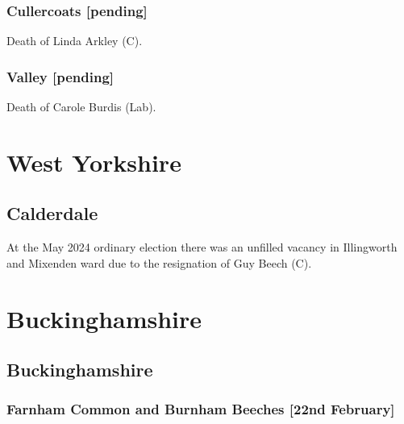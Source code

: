 \documentclass[a4paper,openany]{book}
\begin{document}
\begin{resultsiii}
\subsubsection*{Cullercoats \hspace*{\fill}\nolinebreak[1]%
	\enspace\hspace*{\fill}
	[pending]}


Death of Linda Arkley (C).

\subsubsection*{Valley \hspace*{\fill}\nolinebreak[1]%
	\enspace\hspace*{\fill}
	[pending]}


Death of Carole Burdis (Lab).

\section{West Yorkshire}

\subsection*{Calderdale}

At the May 2024 ordinary election there was an unfilled vacancy in Illingworth and Mixenden ward due to the resignation of Guy Beech (C).%

\section{Buckinghamshire}

\subsection*{Buckinghamshire}

\subsubsection*{Farnham Common and Burnham Beeches \hspace*{\fill}\nolinebreak[1]%
	\enspace\hspace*{\fill}
	[22nd February]}


\end{resultsiii}
\end{document}
